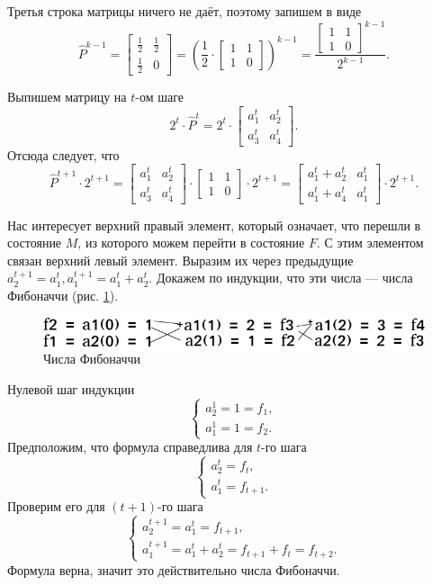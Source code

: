 Третья строка матрицы ничего не даёт, поэтому запишем в виде
$$ \hat{P}^{k-1} =
\begin{bmatrix}
       \frac{1}{2} & \frac{1}{2} \\
       \frac{1}{2} & 0
\end{bmatrix} =
\left( \frac{1}{2} \cdot
\begin{bmatrix}
       1 & 1 \\
       1 & 0
\end{bmatrix} \right)^{k-1} =
\frac{\begin{bmatrix}
       1 & 1 \\
       1 & 0
\end{bmatrix}^{k-1}}{2^{k-1}}.$$

Выпишем матрицу на $t$-ом шаге
$$2^t \cdot \hat{P}^t =
2^t \cdot
\begin{bmatrix}
       a_1^t & a_2^t \\
       a_3^t & a_4^t
\end{bmatrix}.$$
Отсюда следует, что
$$ \hat{P}^{t+1} \cdot 2^{t+1} =
\begin{bmatrix}
       a_1^t & a_2^t \\
       a_3^t & a_4^t
\end{bmatrix} \cdot
\begin{bmatrix}
       1 & 1 \\
       1 & 0
\end{bmatrix} \cdot 2^{t+1} =
\begin{bmatrix}
       a_1^t + a_2^t & a_1^t \\
       a_1^t + a_4^t & a_1^t
\end{bmatrix} \cdot 2^{t+1}.$$

Нас интересует верхний правый элемент, который означает, что перешли в состояние $M$, из которого можем перейти в состояние $F$.
С этим элементом связан верхний левый элемент.
Выразим их через предыдущие $a_2^{t+1} = a_1^t, a_1^{t+1} = a_1^t + a_2^t$.
Докажем по индукции, что эти числа --- числа Фибоначчи (рис. \ref{fig:12151}).

\begin{figure}[h!]
  \centering
  \includegraphics[width=.6\textwidth]{./pictures/12_15_1.png}
  \caption{Числа Фибоначчи}
  \label{fig:12151}
\end{figure}

Нулевой шаг индукции
$$ \begin{cases}
a_2^1 = 1 = f_1, \\
a_1^1 = 1 = f_2.
\end{cases}$$
Предположим, что формула справедлива для $t$-го шага
$$ \begin{cases}
a_2^t = f_t, \\
a_1^t = f_{t+1}.
\end{cases}$$
Проверим его для $ \left( t+1 \right) $-го шага
$$ \begin{cases}
a_2^{t+1} = a_1^t = f_{t+1}, \\
a_1^{t+1} = a_1^t + a_2^t = f_{t+1} + f_t = f_{t+2}.
\end{cases}$$
Формула верна, значит это действительно числа Фибоначчи.

